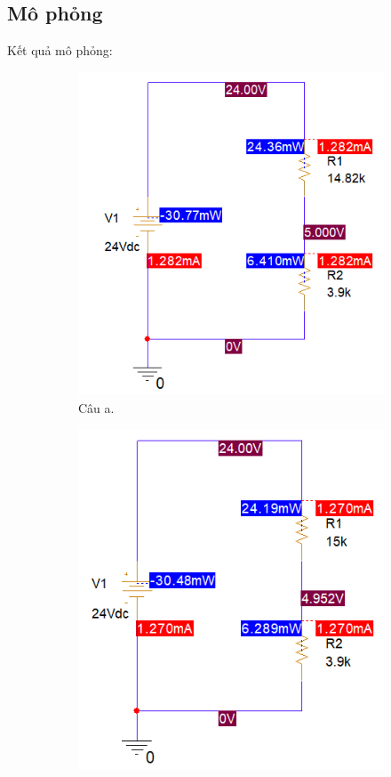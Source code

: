 \subsection{Mô phỏng}
Kết quả mô phỏng:

\begin{figure}[!htbp]
    \centering
    \begin{subfigure}{.5\textwidth}
        \centering
        \includegraphics[width=1\linewidth]{graphics/ex5/f3.PNG}
        \caption{Câu a.}
    \end{subfigure}%
    \begin{subfigure}{.5\textwidth}
        \centering
        \includegraphics[width=1\linewidth]{graphics/ex5/f4.PNG}

\end{subfigure}
\end{figure}
